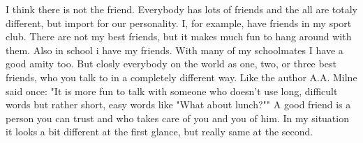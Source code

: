\documentclass[11pt, oneside]{article}
\begin{document}
I think there is not the friend. Everybody has lots of friends and the all are totaly different, but import for our personality. I, for example, have friends in my sport club. There are not my best friends, but it makes much fun to hang around with them. Also in school i have my friends. With many of my schoolmates I have a good amity too. But closly everybody on the world as one, two, or three best friends, who you talk to in a completely different way. Like the author A.A. Milne said once: "It is more fun to talk with someone who doesn't use long, difficult words but rather short, easy words like "What about lunch?"" A good friend is a person you can trust and who takes care of you and you of him. In my situation it looks a bit different at the first glance, but really same at the second.
\end{document}

